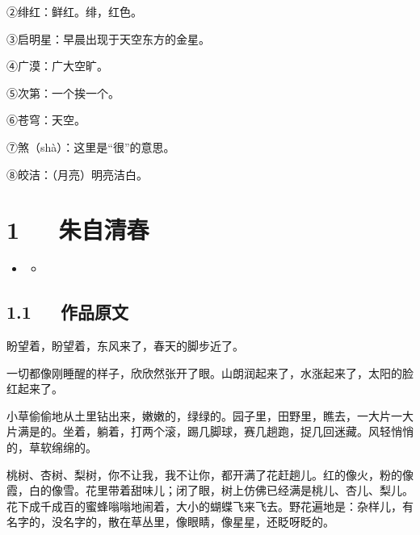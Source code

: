 \documentclass[letterpaper,12pt,english]{sphinxmanual}
\begin{document}
②绯红：鲜红。绯，红色。

③启明星：早晨出现于天空东方的金星。

④广漠：广大空旷。

⑤次第：一个挨一个。

⑥苍穹：天空。

⑦煞（shà）：这里是“很”的意思。

⑧皎洁：（月亮）明亮洁白。


\chapter{1   朱自清\sphinxhyphen{}春}
\label{\detokenize{p01_u6563_u6587/_u6731_u81ea_u6e05-_u6625:id1}}\label{\detokenize{p01_u6563_u6587/_u6731_u81ea_u6e05-_u6625::doc}}
\begin{sphinxShadowBox}
\begin{itemize}
\item {} 
\label{\detokenize{p01_u6563_u6587/_u6731_u81ea_u6e05-_u6625:id4}}{\hyperref[\detokenize{p01_u6563_u6587/_u6731_u81ea_u6e05-_u6625:id1}]{}}
\begin{itemize}
\item {} 
\label{\detokenize{p01_u6563_u6587/_u6731_u81ea_u6e05-_u6625:id5}}{\hyperref[\detokenize{p01_u6563_u6587/_u6731_u81ea_u6e05-_u6625:id3}]{}}

\end{itemize}

\end{itemize}
\end{sphinxShadowBox}


\section{1.1   作品原文}
\label{\detokenize{p01_u6563_u6587/_u6731_u81ea_u6e05-_u6625:id3}}
盼望着，盼望着，东风来了，春天的脚步近了。

一切都像刚睡醒的样子，欣欣然张开了眼。山朗润起来了，水涨起来了，太阳的脸红起来了。

小草偷偷地从土里钻出来，嫩嫩的，绿绿的。园子里，田野里，瞧去，一大片一大片满是的。坐着，躺着，打两个滚，踢几脚球，赛几趟跑，捉几回迷藏。风轻悄悄的，草软绵绵的。

桃树、杏树、梨树，你不让我，我不让你，都开满了花赶趟儿。红的像火，粉的像霞，白的像雪。花里带着甜味儿；闭了眼，树上仿佛已经满是桃儿、杏儿、梨儿。花下成千成百的蜜蜂嗡嗡地闹着，大小的蝴蝶飞来飞去。野花遍地是：杂样儿，有名字的，没名字的，散在草丛里，像眼睛，像星星，还眨呀眨的。
\end{document}
